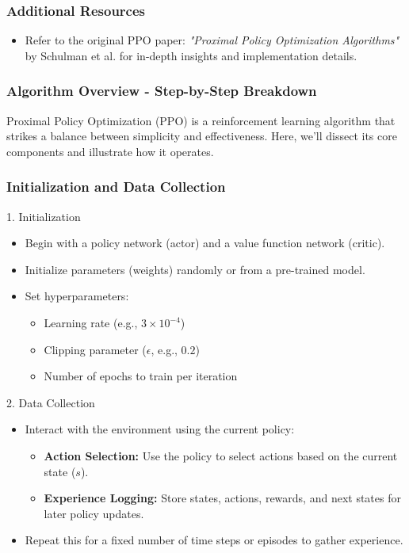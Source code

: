 \documentclass{beamer}
\begin{document}
\begin{frame}[fragile]
    \frametitle{Additional Resources}

    \begin{itemize}
        \item Refer to the original PPO paper: \textit{"Proximal Policy Optimization Algorithms"} by Schulman et al. for in-depth insights and implementation details.
    \end{itemize}
\end{frame}

\begin{frame}[fragile]
    \frametitle{Algorithm Overview - Step-by-Step Breakdown}

    Proximal Policy Optimization (PPO) is a reinforcement learning algorithm that strikes a balance between simplicity and effectiveness. Here, we’ll dissect its core components and illustrate how it operates.

\end{frame}

\begin{frame}[fragile]
    \frametitle{Initialization and Data Collection}

    \begin{block}{1. Initialization}
        \begin{itemize}
            \item Begin with a policy network (actor) and a value function network (critic).
            \item Initialize parameters (weights) randomly or from a pre-trained model.
            \item Set hyperparameters:
            \begin{itemize}
                \item Learning rate (e.g., $3 \times 10^{-4}$)
                \item Clipping parameter ($\epsilon$, e.g., $0.2$)
                \item Number of epochs to train per iteration
            \end{itemize}
        \end{itemize}
    \end{block}

    \begin{block}{2. Data Collection}
        \begin{itemize}
            \item Interact with the environment using the current policy:
            \begin{itemize}
                \item \textbf{Action Selection:} Use the policy to select actions based on the current state ($s$).
                \item \textbf{Experience Logging:} Store states, actions, rewards, and next states for later policy updates.
            \end{itemize}
            \item Repeat this for a fixed number of time steps or episodes to gather experience.
        \end{itemize}
    \end{block}
\end{frame}
\end{document}
